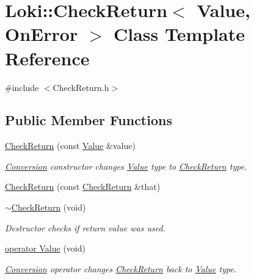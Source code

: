 \hypertarget{classLoki_1_1CheckReturn}{}\section{Loki\+:\+:Check\+Return$<$ Value, On\+Error $>$ Class Template Reference}
\label{classLoki_1_1CheckReturn}


{\ttfamily \#include $<$Check\+Return.\+h$>$}

\subsection*{Public Member Functions}
\begin{DoxyCompactItemize}
\item 
\hypertarget{classLoki_1_1CheckReturn_a9e250eb61af69adaee7773a79400a6f7}{}\hyperlink{classLoki_1_1CheckReturn_a9e250eb61af69adaee7773a79400a6f7}{Check\+Return} (const \hyperlink{structValue}{Value} \&value)\label{classLoki_1_1CheckReturn_a9e250eb61af69adaee7773a79400a6f7}

\begin{DoxyCompactList}\small\item\em \hyperlink{structLoki_1_1Conversion}{Conversion} constructor changes \hyperlink{structValue}{Value} type to \hyperlink{classLoki_1_1CheckReturn}{Check\+Return} type. \end{DoxyCompactList}\item 
\hyperlink{classLoki_1_1CheckReturn_ac25f0d90452244c84dafbb23c5cdb012}{Check\+Return} (const \hyperlink{classLoki_1_1CheckReturn}{Check\+Return} \&that)
\item 
\hypertarget{classLoki_1_1CheckReturn_a9da9337fca355e5dbcadc246159719f7}{}\hyperlink{classLoki_1_1CheckReturn_a9da9337fca355e5dbcadc246159719f7}{$\sim$\+Check\+Return} (void)\label{classLoki_1_1CheckReturn_a9da9337fca355e5dbcadc246159719f7}

\begin{DoxyCompactList}\small\item\em Destructor checks if return value was used. \end{DoxyCompactList}\item 
\hypertarget{classLoki_1_1CheckReturn_a6a77fab4729207c4c74ac74317ba58d6}{}\hyperlink{classLoki_1_1CheckReturn_a6a77fab4729207c4c74ac74317ba58d6}{operator Value} (void)\label{classLoki_1_1CheckReturn_a6a77fab4729207c4c74ac74317ba58d6}

\begin{DoxyCompactList}\small\item\em \hyperlink{structLoki_1_1Conversion}{Conversion} operator changes \hyperlink{classLoki_1_1CheckReturn}{Check\+Return} back to \hyperlink{structValue}{Value} type. \end{DoxyCompactList}\end{DoxyCompactItemize}


